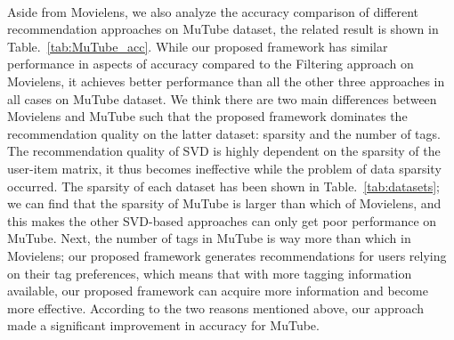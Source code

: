 \documentclass[a4paper,12pt]{report}
\begin{document}
\paragraph{}
Aside from Movielens, we also analyze the accuracy comparison of different recommendation approaches on MuTube dataset, the related result is shown in Table.~\ref{tab:MuTube_acc}. While our proposed framework has similar performance in aspects of accuracy compared to the Filtering approach on Movielens, it achieves better performance than all the other three approaches in all cases on MuTube dataset. We think there are two main differences between Movielens and MuTube such that the proposed framework dominates the recommendation quality on the latter dataset: sparsity and the number of tags. The recommendation quality of SVD is highly dependent on the sparsity of the user-item matrix, it thus becomes ineffective while the problem of data sparsity occurred. The sparsity of each dataset has been shown in Table.~\ref{tab:datasets}; we can find that the sparsity of MuTube is larger than which of Movielens, and this makes the other SVD-based approaches can only get poor performance on MuTube. Next, the number of tags in MuTube is way more than which in Movielens; our proposed framework generates recommendations for users relying on their tag preferences, which means that with more tagging information available, our proposed framework can acquire more information and become more effective. According to the two reasons mentioned above, our approach made a significant improvement in accuracy for MuTube.
\end{document}

